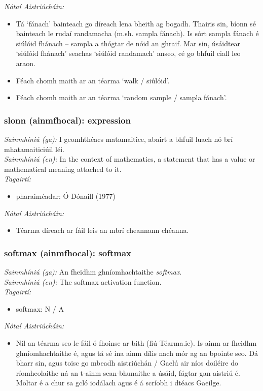 \documentclass{article}
\begin{document}
 \noindent \textit{Nótaí Aistriúcháin:}
\begin{itemize}
	\item Tá `fánach' bainteach go díreach lena bheith ag bogadh. Thairis sin, bíonn sé bainteach le rudaí randamacha (m.sh. sampla fánach). Is sórt sampla fánach é siúlóid fhánach -- sampla a thógtar de nóid an ghraif. Mar sin, úsáidtear `siúlóid fhánach' seachas `siúlóid randamach' anseo, cé go bhfuil ciall leo araon.
	\item Féach chomh maith ar an téarma `walk / siúlóid'.
	\item Féach chomh maith ar an téarma `random sample / sampla fánach'.
\end{itemize}


\subsubsection*{slonn (ainmfhocal): expression}
 \noindent \textit{Sainmhíniú (ga):} I gcomhthéacs matamaitice, abairt a bhfuil luach nó brí mhatamaiticiúil léi.
\\
 \noindent \textit{Sainmhíniú (en):} In the context of mathematics, a statement that has a value or mathematical meaning attached to it.
\\
 \noindent \textit{Tagairtí:}
\begin{itemize}
	\item pharaiméadar: Ó Dónaill (1977) \cite{odonaill}
\end{itemize}

 \noindent \textit{Nótaí Aistriúcháin:}
\begin{itemize}
	\item Téarma díreach ar fáil leis an mbrí cheannann chéanna.
\end{itemize}


\subsubsection*{softmax (ainmfhocal): softmax}
 \noindent \textit{Sainmhíniú (ga):} An fheidhm ghníomhachtaithe  \noindent \textit{softmax}.
\\
 \noindent \textit{Sainmhíniú (en):} The softmax activation function.
\\
 \noindent \textit{Tagairtí:}
\begin{itemize}
	\item softmax: N / A
\end{itemize}

 \noindent \textit{Nótaí Aistriúcháin:}
\begin{itemize}
	\item Níl an téarma seo le fáil ó fhoinse ar bith (fiú Téarma.ie). Is ainm ar fheidhm ghníomhachtaithe é, agus tá sé ina ainm dílis nach mór ag an bpointe seo. Dá bharr sin, agus toisc go mbeadh aistriúchán / Gaelú air níos doiléire do ríomheolaithe ná an t-ainm sean-bhunaithe a úsáid, fágtar gan aistriú é. Moltar é a chur sa gcló iodálach agus é á scríobh i dtéacs Gaeilge.
\end{itemize}
\end{document}
